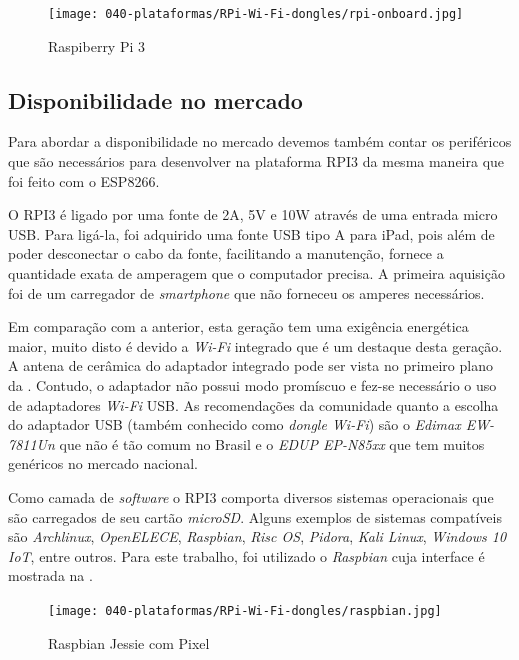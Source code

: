\begin{figure}[htb]
	\caption{\label{fig:rpi-3}Raspiberry Pi 3 }
	\begin{center}
		\texttt{[image: 040-plataformas/RPi-Wi-Fi-dongles/rpi-onboard.jpg]}
	\end{center}
\end{figure}



\subsection{Disponibilidade no mercado}
\label{subsec:mercado-esp}

Para abordar a disponibilidade no mercado devemos também contar os periféricos
que são necessários para desenvolver na plataforma  RPI3 da mesma maneira que
foi feito com o ESP8266.

O RPI3 é ligado por uma fonte de 2A, 5V e 10W através de uma entrada micro
USB. Para ligá-la, foi adquirido uma fonte USB tipo A para iPad, pois além de
poder desconectar o cabo da fonte, facilitando a manutenção, fornece a
quantidade exata de amperagem que o computador precisa. A primeira aquisição foi
de um carregador de \emph{smartphone} que não forneceu os amperes necessários.

Em comparação com a anterior, esta geração  tem uma exigência energética maior,
muito disto é devido a \emph{Wi-Fi} integrado que é um destaque desta geração.
A antena de cerâmica do adaptador integrado pode ser vista no primeiro plano da
. Contudo, o adaptador não possui modo promíscuo e fez-se
necessário o uso de adaptadores \emph{Wi-Fi} USB. As recomendações da comunidade
quanto a escolha do adaptador USB (também conhecido como \emph{dongle Wi-Fi})
são o \emph{Edimax EW-7811Un} que não é tão comum no Brasil e o
\emph{EDUP EP-N85xx} que tem muitos genéricos no mercado nacional.

Como camada de \emph{software} o RPI3 comporta diversos sistemas operacionais que são carregados de seu
cartão \emph{microSD}. Alguns exemplos de sistemas compatíveis são
\emph{Archlinux}, \emph{OpenELECE}, \emph{Raspbian}, \emph{Risc OS},
\emph{Pidora}, \emph{Kali Linux}, \emph{Windows 10 IoT}, entre outros. Para este
trabalho, foi utilizado o \emph{Raspbian} cuja interface é mostrada na
.

\begin{figure}[htb]
	\caption{\label{fig:raspbian-jessie}Raspbian Jessie com Pixel}
	\begin{center}
		\texttt{[image: 040-plataformas/RPi-Wi-Fi-dongles/raspbian.jpg]}
	\end{center}
\end{figure}

